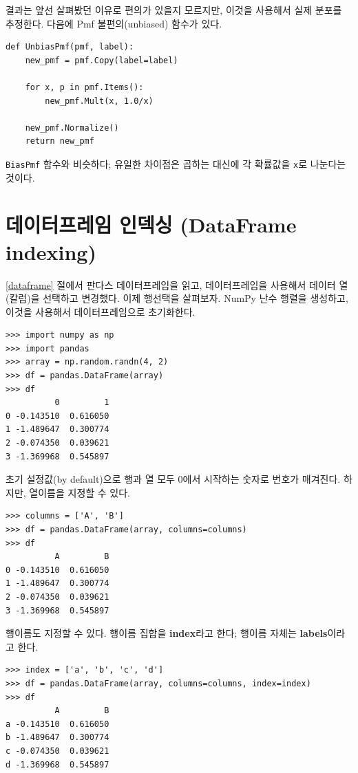 결과는 앞선 살펴봤던 이유로 편의가 있을지 모르지만, 이것을 사용해서 실제 분포를 추정한다. 다음에 Pmf 불편의(unbiased) 함수가 있다. 

\begin{verbatim}
def UnbiasPmf(pmf, label):
    new_pmf = pmf.Copy(label=label)

    for x, p in pmf.Items():
        new_pmf.Mult(x, 1.0/x)
        
    new_pmf.Normalize()
    return new_pmf
\end{verbatim}

{\tt BiasPmf} 함수와 비슷하다; 유일한 차이점은 곱하는 대신에 각 확률값을 {\tt x}로 나눈다는 것이다.

\section{데이터프레임 인덱싱 (DataFrame indexing)}

\ref{dataframe} 절에서 판다스 데이터프레임을 읽고, 데이터프레임을 사용해서 데이터 열(칼럼)을 선택하고 변경했다. 
이제 행선택을 살펴보자.
NumPy 난수 행렬을 생성하고, 이것을 사용해서 데이터프레임으로 초기화한다.


\begin{verbatim}
>>> import numpy as np
>>> import pandas
>>> array = np.random.randn(4, 2)
>>> df = pandas.DataFrame(array)
>>> df
          0         1
0 -0.143510  0.616050
1 -1.489647  0.300774
2 -0.074350  0.039621
3 -1.369968  0.545897
\end{verbatim}

초기 설정값(by default)으로 행과 열 모두 0에서 시작하는 숫자로 번호가 매겨진다. 하지만, 열이름을 지정할 수 있다.

\begin{verbatim}
>>> columns = ['A', 'B']
>>> df = pandas.DataFrame(array, columns=columns)
>>> df
          A         B
0 -0.143510  0.616050
1 -1.489647  0.300774
2 -0.074350  0.039621
3 -1.369968  0.545897
\end{verbatim}

행이름도 지정할 수 있다. 행이름 집합을 {\bf index}라고 한다; 
행이름 자체는 {\bf labels}이라고 한다.

\begin{verbatim}
>>> index = ['a', 'b', 'c', 'd']
>>> df = pandas.DataFrame(array, columns=columns, index=index)
>>> df
          A         B
a -0.143510  0.616050
b -1.489647  0.300774
c -0.074350  0.039621
d -1.369968  0.545897
\end{verbatim}


